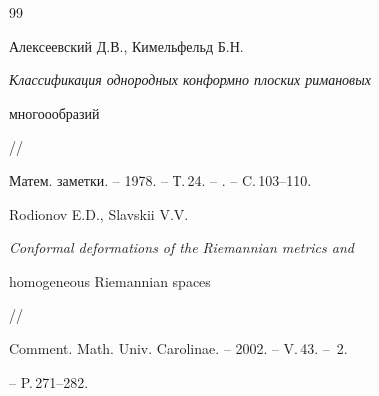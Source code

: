 \begin{thebibliography}{99}


Алексеевский Д.В., Кимельфельд Б.Н.


 {\em Классификация однородных конформно плоских римановых


многоообразий} //


 Матем. заметки. -- 1978. -- Т.\,24. -- . -- C.\,103--110.







Rodionov E.D., Slavskii V.V.


 {\em Conformal deformations of the Riemannian metrics and


homogeneous Riemannian spaces} //


Comment. Math. Univ. Carolinae. -- 2002. -- V.\,43. -- \No\,2.


-- P.\,271--282.





\end{thebibliography}









